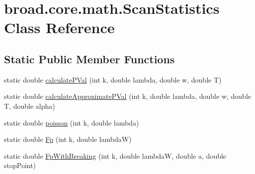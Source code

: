 \hypertarget{classbroad_1_1core_1_1math_1_1_scan_statistics}{\section{broad.\+core.\+math.\+Scan\+Statistics Class Reference}
\label{classbroad_1_1core_1_1math_1_1_scan_statistics}
}
\subsection*{Static Public Member Functions}
\begin{DoxyCompactItemize}
\item 
static double \hyperlink{classbroad_1_1core_1_1math_1_1_scan_statistics_adfa56e760fadf1adcdf23c62062ff0e3}{calculate\+P\+Val} (int k, double lambda, double w, double T)
\item 
static double \hyperlink{classbroad_1_1core_1_1math_1_1_scan_statistics_a0bcb18905e2ec14223a7038d0293aae0}{calculate\+Approximate\+P\+Val} (int k, double lambda, double w, double T, double alpha)
\item 
static double \hyperlink{classbroad_1_1core_1_1math_1_1_scan_statistics_a77b4b69863064f3823d91097593d683f}{poisson} (int k, double lambda)
\item 
static double \hyperlink{classbroad_1_1core_1_1math_1_1_scan_statistics_ae58b04b50ab813db6f4d8adccf89fa07}{Fp} (int k, double lambda\+W)
\item 
static double \hyperlink{classbroad_1_1core_1_1math_1_1_scan_statistics_a012ae6be1e0a82d5f77c58970b288b6c}{Fp\+With\+Breaking} (int k, double lambda\+W, double a, double stop\+Point)
\end{DoxyCompactItemize}


